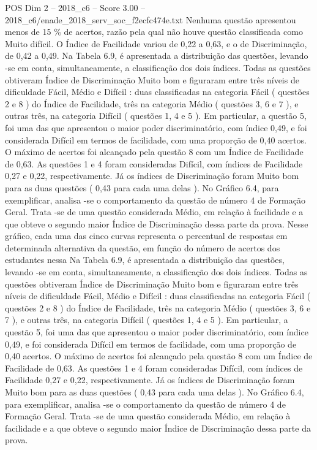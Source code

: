\begin{textsample}{POS Dim 2 – 2018\_c6 – Score 3.00 – 2018\_c6/enade\_2018\_serv\_soc\_f2ecfc474e.txt}
Nenhuma questão apresentou menos de 15 \% de acertos, razão pela qual não houve questão classificada como Muito difícil.
O Índice de Facilidade variou de 0,22 a 0,63, e o de Discriminação, de 0,42 a 0,49.
Na Tabela 6.9, é apresentada a distribuição das questões, levando -se em conta, simultaneamente, a classificação dos dois índices.
Todas as questões obtiveram Índice de Discriminação Muito bom e figuraram entre três níveis de dificuldade Fácil, Médio e Difícil : duas classificadas na categoria Fácil ( questões 2 e 8 ) do Índice de Facilidade, três na categoria Médio ( questões 3, 6 e 7 ), e outras três, na categoria Difícil ( questões 1, 4 e 5 ).
Em particular, a questão 5, foi uma das que apresentou o maior poder discriminatório, com índice 0,49, e foi considerada Difícil em termos de facilidade, com uma proporção de 0,40 acertos.
O máximo de acertos foi alcançado pela questão 8 com um Índice de Facilidade de 0,63.
As questões 1 e 4 foram consideradas Difícil, com índices de Facilidade 0,27 e 0,22, respectivamente.
Já os índices de Discriminação foram Muito bom para as duas questões ( 0,43 para cada uma delas ).
No Gráfico 6.4, para exemplificar, analisa -se o comportamento da questão de número 4 de Formação Geral.
Trata -se de uma questão considerada Médio, em relação à facilidade e a que obteve o segundo maior Índice de Discriminação dessa parte da prova.
Nesse gráfico, cada uma das cinco curvas representa o percentual de respostas em determinada alternativa da questão, em função do número de acertos dos estudantes nessa Na Tabela 6.9, é apresentada a distribuição das questões, levando -se em conta, simultaneamente, a classificação dos dois índices.
Todas as questões obtiveram Índice de Discriminação Muito bom e figuraram entre três níveis de dificuldade Fácil, Médio e Difícil : duas classificadas na categoria Fácil ( questões 2 e 8 ) do Índice de Facilidade, três na categoria Médio ( questões 3, 6 e 7 ), e outras três, na categoria Difícil ( questões 1, 4 e 5 ).
Em particular, a questão 5, foi uma das que apresentou o maior poder discriminatório, com índice 0,49, e foi considerada Difícil em termos de facilidade, com uma proporção de 0,40 acertos.
O máximo de acertos foi alcançado pela questão 8 com um Índice de Facilidade de 0,63.
As questões 1 e 4 foram consideradas Difícil, com índices de Facilidade 0,27 e 0,22, respectivamente.
Já os índices de Discriminação foram Muito bom para as duas questões ( 0,43 para cada uma delas ).
No Gráfico 6.4, para exemplificar, analisa -se o comportamento da questão de número 4 de Formação Geral.
Trata -se de uma questão considerada Médio, em relação à facilidade e a que obteve o segundo maior Índice de Discriminação dessa parte da prova.

\end{textsample}
